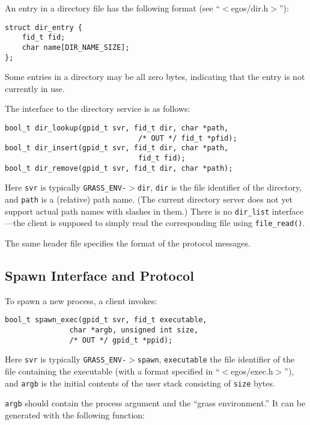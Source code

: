 \documentclass{article}
\begin{document}
An entry in a directory file has the following format
(see ``$<$egos/dir.h$>$''):

\begin{verbatim}
struct dir_entry {
    fid_t fid;
    char name[DIR_NAME_SIZE];
};
\end{verbatim}

Some entries in a directory may be all zero bytes, indicating that
the entry is not currently in use.

The interface to the directory service is as follows:

\begin{verbatim}
bool_t dir_lookup(gpid_t svr, fid_t dir, char *path,
                               /* OUT */ fid_t *pfid);
bool_t dir_insert(gpid_t svr, fid_t dir, char *path,
                               fid_t fid);
bool_t dir_remove(gpid_t svr, fid_t dir, char *path);
\end{verbatim}

Here \texttt{svr} is typically \texttt{GRASS\_ENV-$>$dir},
\texttt{dir} is the file identifier of the directory, and \texttt{path}
is a (relative) path name.  (The current directory server does not yet
support actual path names with slashes in them.)
There is no \texttt{dir\_list} interface---the client is supposed to simply
read the corresponding file using \texttt{file\_read()}.

The same header file specifies the format of the protocol messages.

\subsection{Spawn Interface and Protocol}

To spawn a new process, a client invokes:

\begin{verbatim}
bool_t spawn_exec(gpid_t svr, fid_t executable,
               char *argb, unsigned int size,
               /* OUT */ gpid_t *ppid);
\end{verbatim}

Here \texttt{svr} is typically \texttt{GRASS\_ENV-$>$spawn},
\texttt{executable} the file identifier of the file containing
the executable (with a format specified in ``$<$egos/exec.h$>$''),
and \texttt{argb} is the initial contents of the user stack
consisting of \texttt{size} bytes.

\texttt{argb} should contain the process argument and the
``grass environment.''  It can be generated with the following
function:
\end{document}
